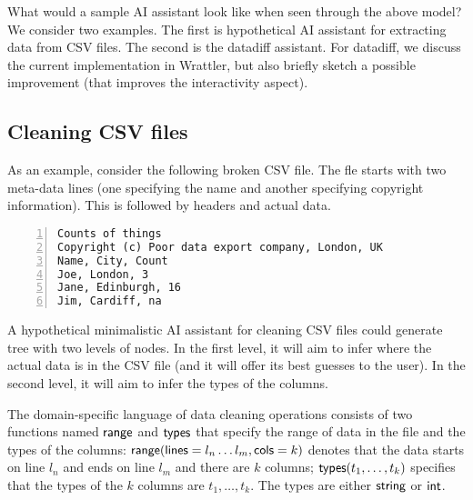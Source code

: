 \documentclass{article}
\begin{document}
What would a sample AI assistant look like when seen through the above model? We consider two
examples. The first is hypothetical AI assistant for extracting data from CSV files. The second
is the datadiff assistant. For datadiff, we discuss the current implementation in Wrattler, but
also briefly sketch a possible improvement (that improves the interactivity aspect).

\subsection{Cleaning CSV files}

As an example, consider the following broken CSV file. The fle starts with two meta-data lines
(one specifying the name and another specifying copyright information). This is followed by headers
and actual data.

\begin{Verbatim}[numbers=left,xleftmargin=8mm]
Counts of things
Copyright (c) Poor data export company, London, UK
Name, City, Count
Joe, London, 3
Jane, Edinburgh, 16
Jim, Cardiff, na
\end{Verbatim}

A hypothetical minimalistic AI assistant for cleaning CSV files could generate tree with two
levels of nodes. In the first level, it will aim to infer where the actual data is in the CSV
file (and it will offer its best guesses to the user). In the second level, it will aim to infer
the types of the columns. 

The domain-specific language of data cleaning operations consists of two functions named
$\textnormal{\sffamily range}$ and $\textnormal{\sffamily types}$ that specify the range of data in the file and the types
of the columns: $\textnormal{\sffamily range}(\textnormal{\sffamily lines}=l_n\ldots l_m, \textnormal{\sffamily cols}=k)$ denotes that
the data starts on line $l_n$ and ends on line $l_m$ and there are $k$ columns; 
$\textnormal{\sffamily types}(t_1,\ldots, t_k)$ specifies that the types of the $k$ columns are 
$t_1, \ldots, t_k$. The types are either $\textnormal{\sffamily string}$ or $\textnormal{\sffamily int}$.
\end{document}
